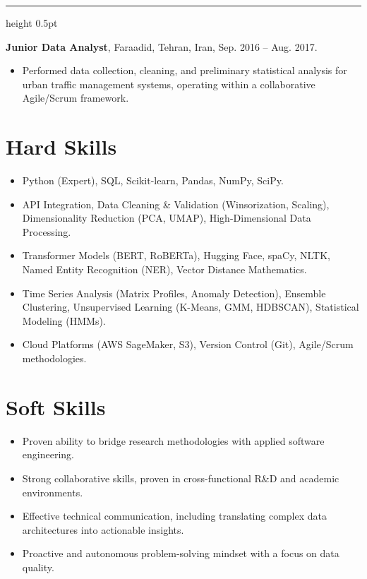 \documentclass[11pt,a4paper]{article}
\begin{document}
\vspace{3mm}
{\color{gray!75}\hrule height 0.5pt}
\vspace{2mm}

\textbf{Junior Data Analyst}, Faraadid, Tehran, Iran, Sep. 2016 -- Aug. 2017.
\begin{itemize}[leftmargin=*, nosep, topsep=2pt]
    \item Performed data collection, cleaning, and preliminary statistical analysis for urban traffic management systems, operating within a collaborative Agile/Scrum framework.
\end{itemize}

\vspace{2mm}
\section{Hard Skills}
\begin{itemize}[leftmargin=*, nosep, topsep=2pt]
    \item Python (Expert), SQL, Scikit-learn, Pandas, NumPy, SciPy.
    \item API Integration, Data Cleaning \& Validation (Winsorization, Scaling), Dimensionality Reduction (PCA, UMAP), High-Dimensional Data Processing.
    \item Transformer Models (BERT, RoBERTa), Hugging Face, spaCy, NLTK, Named Entity Recognition (NER), Vector Distance Mathematics.
    \item Time Series Analysis (Matrix Profiles, Anomaly Detection), Ensemble Clustering, Unsupervised Learning (K-Means, GMM, HDBSCAN), Statistical Modeling (HMMs).
    \item Cloud Platforms (AWS SageMaker, S3), Version Control (Git), Agile/Scrum methodologies.
\end{itemize}

\vspace{2mm}
\section{Soft Skills}
\begin{itemize}[leftmargin=*, nosep, topsep=2pt]
    \item Proven ability to bridge research methodologies with applied software engineering.
    \item Strong collaborative skills, proven in cross-functional R\&D and academic environments.
    \item Effective technical communication, including translating complex data architectures into actionable insights.
    \item Proactive and autonomous problem-solving mindset with a focus on data quality.
\end{itemize}
\end{document}
